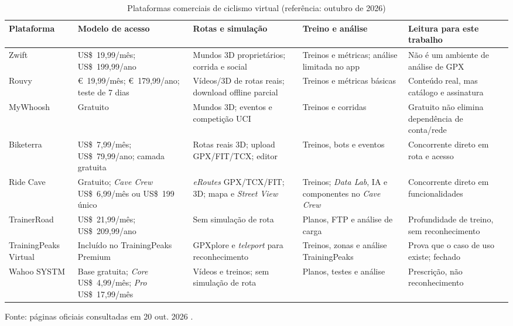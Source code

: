 \begin{table}[H]
    \centering
    \caption{Plataformas comerciais de ciclismo virtual (referência: outubro de 2026)}
    \label{tab:comerciais}
    \footnotesize
    \renewcommand{\arraystretch}{1.15}
    \setlength{\tabcolsep}{4pt}
    \begin{tabular}{@{}>{\raggedright\arraybackslash}p{2.5cm}
        >{\raggedright\arraybackslash}p{3.0cm}
        >{\raggedright\arraybackslash}p{3.3cm}
        >{\raggedright\arraybackslash}p{3.4cm}
        >{\raggedright\arraybackslash}p{2.4cm}@{}
    }
        \toprule
        \textbf{Plataforma} & \textbf{Modelo de acesso} &
        \textbf{Rotas e simulação} & \textbf{Treino e análise} &
        \textbf{Leitura para este trabalho} \\
        \midrule
        Zwift & US\$~19,99/mês; US\$~199,99/ano &
        Mundos 3D proprietários; corrida e social &
        Treinos e métricas; análise limitada no app &
        Não é um ambiente de análise de GPX \\
        Rouvy & €~19,99/mês; €~179,99/ano; teste de 7 dias &
        Vídeos/3D de rotas reais; download offline parcial &
        Treinos e métricas básicas &
        Conteúdo real, mas catálogo e assinatura \\
        MyWhoosh & Gratuito &
        Mundos 3D; eventos e competição UCI &
        Treinos e corridas &
        Gratuito não elimina dependência de conta/rede \\
        Biketerra & US\$~7,99/mês; US\$~79,99/ano; camada gratuita &
        Rotas reais 3D; upload GPX/FIT/TCX; editor &
        Treinos, bots e eventos &
        Concorrente direto em rota e acesso \\
        Ride Cave & Gratuito; \textit{Cave Crew} US\$~6,99/mês ou US\$~199 único &
        \textit{eRoutes} GPX/TCX/FIT; 3D; mapa e \textit{Street View} &
        Treinos; \textit{Data Lab}, IA e componentes no \textit{Cave Crew} &
        Concorrente direto em funcionalidades \\
        TrainerRoad & US\$~21,99/mês; US\$~209,99/ano &
        Sem simulação de rota &
        Planos, FTP e análise de carga &
        Profundidade de treino, sem reconhecimento \\
        TrainingPeaks Virtual & Incluído no TrainingPeaks Premium &
        GPXplore e \textit{teleport} para reconhecimento &
        Treinos, zonas e análise TrainingPeaks &
        Prova que o caso de uso existe; fechado \\
        Wahoo SYSTM & Base gratuita; \textit{Core} US\$~4,99/mês; \textit{Pro} US\$~17,99/mês &
        Vídeos e treinos; sem simulação de rota &
        Planos, testes e análise &
        Prescrição, não reconhecimento \\
        \bottomrule
    \end{tabular}
    \vspace{0.2cm}
    \par\small Fonte: páginas oficiais consultadas em 20 out. 2026
    \cite{zwift_pricing,rouvy_pricing,mywhoosh_site,biketerra_pricing,ridecave_pricing,trainerroad_pricing,trainingpeaks_virtual,wahoo_systm}.
\end{table}

